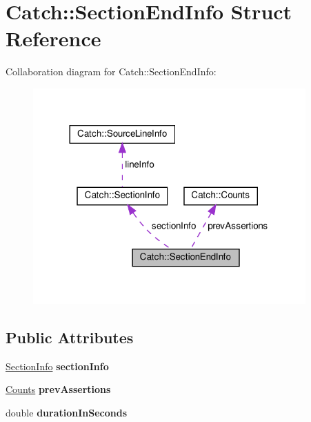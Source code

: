 \hypertarget{structCatch_1_1SectionEndInfo}{}\section{Catch\+::Section\+End\+Info Struct Reference}
\label{structCatch_1_1SectionEndInfo}


Collaboration diagram for Catch\+::Section\+End\+Info\+:
\nopagebreak
\begin{figure}[H]
\begin{center}
\leavevmode
\includegraphics[width=296pt]{structCatch_1_1SectionEndInfo__coll__graph}
\end{center}
\end{figure}
\subsection*{Public Attributes}
\begin{DoxyCompactItemize}
\item 
\mbox{\label{structCatch_1_1SectionEndInfo_a2d44793392cb83735d086d726822abe9}} 
\mbox{\hyperlink{structCatch_1_1SectionInfo}{Section\+Info}} {\bfseries section\+Info}
\item 
\mbox{\label{structCatch_1_1SectionEndInfo_ae70b154cbc05b5dd2901d97f89303d8c}} 
\mbox{\hyperlink{structCatch_1_1Counts}{Counts}} {\bfseries prev\+Assertions}
\item 
\mbox{\label{structCatch_1_1SectionEndInfo_a7c262f2dab9cff166b8eca620c47eea5}} 
double {\bfseries duration\+In\+Seconds}
\end{DoxyCompactItemize}


